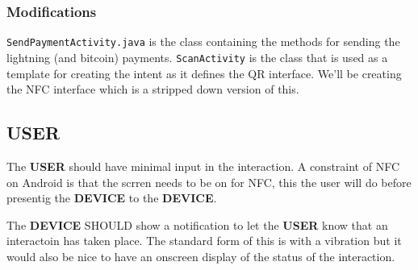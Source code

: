 \documentclass[a4paper]{article}
\begin{document}
\subsubsection{Modifications}
\verb|SendPaymentActivity.java| is the class containing the methods for sending the
lightning (and bitcoin) payments.
\verb|ScanActivity| is the class that is used as a template for creating the intent as
it defines the QR interface.  We'll be creating the NFC interface which is a stripped
down version of this.

\subsection{USER}
The \textbf{USER} should have minimal input in the interaction.  A constraint of NFC on Android
is that the scrren needs to be on for NFC, this the user will do before presentig the
\textbf{DEVICE} to the \textbf{DEVICE}.

The \textbf{DEVICE} SHOULD show a notification to let the \textbf{USER} know that an interactoin has
taken place.  The standard form of this is with a vibration but it would also be nice to
have an onscreen display of the status of the interaction.
\end{document}
